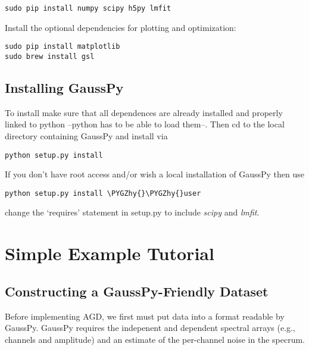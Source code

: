 \documentclass[letterpaper,10pt,openany,oneside]{sphinxmanual}
\def\PYGZhy{\char`\-}
\begin{document}
\begin{Verbatim}[commandchars=\\\{\}]
sudo pip install numpy scipy h5py lmfit
\end{Verbatim}

Install the optional dependencies for plotting and optimization:

\begin{Verbatim}[commandchars=\\\{\}]
sudo pip install matplotlib
sudo brew install gsl
\end{Verbatim}


\section{Installing GaussPy}
\label{install:installing-gausspy}
To install make sure that all dependences are already installed and properly
linked to python --python has to be able to load them--. Then cd to the local
directory containing GaussPy and install via

\begin{Verbatim}[commandchars=\\\{\}]
python setup.py install
\end{Verbatim}

If you don't have root access and/or wish a local installation of
GaussPy then use

\begin{Verbatim}[commandchars=\\\{\}]
python setup.py install \PYGZhy{}\PYGZhy{}user
\end{Verbatim}

change the `requires' statement in setup.py to include \emph{scipy} and \emph{lmfit}.


\chapter{Simple Example Tutorial}
\label{tutorial::doc}\label{tutorial:simple-example-tutorial}\label{tutorial:id1}

\section{Constructing a GaussPy-Friendly Dataset}
\label{tutorial:constructing-a-gausspy-friendly-dataset}
Before implementing AGD, we first must put data into a format readable by
GaussPy. GaussPy requires the indepenent and dependent spectral arrays (e.g.,
channels and amplitude) and an estimate of the per-channel noise in the specrum.
\end{document}
